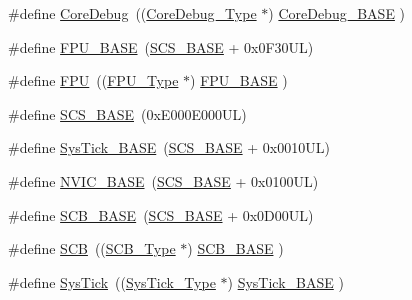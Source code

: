 \begin{DoxyCompactItemize}
\item 
\#define \hyperlink{group___c_m_s_i_s__core__base_gab6e30a2b802d9021619dbb0be7f5d63d}{Core\+Debug}~((\hyperlink{struct_core_debug___type}{Core\+Debug\+\_\+\+Type} $\ast$)     \hyperlink{group___c_m_s_i_s__core__base_ga680604dbcda9e9b31a1639fcffe5230b}{Core\+Debug\+\_\+\+B\+A\+SE}   )
\item 
\#define \hyperlink{group___c_m_s_i_s__core__base_ga4dcad4027118c098c07bcd575f1fbb28}{F\+P\+U\+\_\+\+B\+A\+SE}~(\hyperlink{group___c_m_s_i_s__core__base_ga3c14ed93192c8d9143322bbf77ebf770}{S\+C\+S\+\_\+\+B\+A\+SE} +  0x0\+F30\+U\+L)
\item 
\#define \hyperlink{group___c_m_s_i_s__core__base_gabc7c93f2594e85ece1e1a24f10591428}{F\+PU}~((\hyperlink{struct_f_p_u___type}{F\+P\+U\+\_\+\+Type}       $\ast$)     \hyperlink{group___c_m_s_i_s__core__base_ga4dcad4027118c098c07bcd575f1fbb28}{F\+P\+U\+\_\+\+B\+A\+SE}         )
\item 
\#define \hyperlink{group___c_m_s_i_s__core__base_ga3c14ed93192c8d9143322bbf77ebf770}{S\+C\+S\+\_\+\+B\+A\+SE}~(0x\+E000\+E000\+U\+L)
\item 
\#define \hyperlink{group___c_m_s_i_s__core__base_ga58effaac0b93006b756d33209e814646}{Sys\+Tick\+\_\+\+B\+A\+SE}~(\hyperlink{group___c_m_s_i_s__core__base_ga3c14ed93192c8d9143322bbf77ebf770}{S\+C\+S\+\_\+\+B\+A\+SE} +  0x0010\+U\+L)
\item 
\#define \hyperlink{group___c_m_s_i_s__core__base_gaa0288691785a5f868238e0468b39523d}{N\+V\+I\+C\+\_\+\+B\+A\+SE}~(\hyperlink{group___c_m_s_i_s__core__base_ga3c14ed93192c8d9143322bbf77ebf770}{S\+C\+S\+\_\+\+B\+A\+SE} +  0x0100\+U\+L)
\item 
\#define \hyperlink{group___c_m_s_i_s__core__base_gad55a7ddb8d4b2398b0c1cfec76c0d9fd}{S\+C\+B\+\_\+\+B\+A\+SE}~(\hyperlink{group___c_m_s_i_s__core__base_ga3c14ed93192c8d9143322bbf77ebf770}{S\+C\+S\+\_\+\+B\+A\+SE} +  0x0\+D00\+U\+L)
\item 
\#define \hyperlink{group___c_m_s_i_s__core__base_gaaaf6477c2bde2f00f99e3c2fd1060b01}{S\+CB}~((\hyperlink{struct_s_c_b___type}{S\+C\+B\+\_\+\+Type}       $\ast$)     \hyperlink{group___c_m_s_i_s__core__base_gad55a7ddb8d4b2398b0c1cfec76c0d9fd}{S\+C\+B\+\_\+\+B\+A\+SE}      )
\item 
\#define \hyperlink{group___c_m_s_i_s__core__base_gacd96c53beeaff8f603fcda425eb295de}{Sys\+Tick}~((\hyperlink{struct_sys_tick___type}{Sys\+Tick\+\_\+\+Type}   $\ast$)     \hyperlink{group___c_m_s_i_s__core__base_ga58effaac0b93006b756d33209e814646}{Sys\+Tick\+\_\+\+B\+A\+SE}  )

\end{DoxyCompactItemize}
